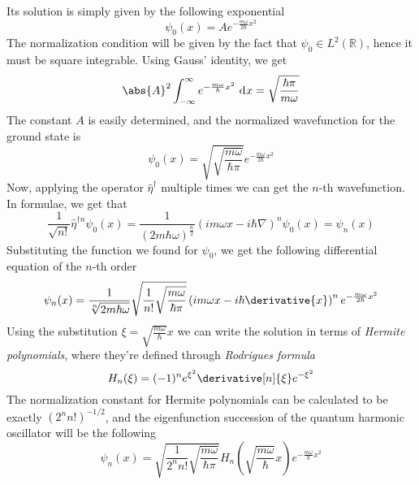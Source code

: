 \documentclass[a4paper, 11pt]{book}
\newcommand{\1}{\opr{\mathds{1}}}
\newcommand{\diff}[2][]{\ \mathrm{d}^{#1}#2}
\newcommand{\opr}[1]{\hat{#1}}
\newcommand{\adj}[2][]{#2^{\dagger#1}}
\theoremstyle{plain}
\begin{document}
	Its solution is simply given by the following exponential
	\begin{equation*}
		\psi_0(x)=Ae^{-\frac{m\omega}{2\hbar}x^2}
	\end{equation*}
	The normalization condition will be given by the fact that $\psi_0\in L^2(\mathbb{R})$, hence it must be square integrable. Using Gauss' identity, we get
	\begin{equation*}
		\abs{A}^2\int_{-\infty}^{\infty}e^{-\frac{m\omega}{\hbar}x^2}\diff{x}=\sqrt{\frac{\hbar\pi}{m\omega}}
	\end{equation*}
	The constant $A$ is easily determined, and the normalized wavefunction for the ground state is
	\begin{equation}
		\psi_0(x)=\sqrt{\sqrt{\frac{m\omega}{\hbar\pi}}}e^{-\frac{m\omega}{2\hbar}x^2}
		\label{eq:qhogsnorm}
	\end{equation}
	Now, applying the operator $\adj{\opr{\eta}}$ multiple times we can get the $n$-th wavefunction. In formulae, we get that
	\begin{equation*}
		\frac{1}{\sqrt{n!}}\adj[n]{\opr{\eta}}\psi_0(x)=\frac{1}{(2m\hbar\omega)^\frac{n}{2}}\left( im\omega x-i\hbar\nabla \right)^n\psi_0(x)=\psi_n(x)
	\end{equation*}
	Substituting the function we found for $\psi_0$, we get the following differential equation of the $n$-th order
	\begin{equation}
		\psi_n(x)=\frac{1}{\sqrt[n]{2m\hbar\omega}}\sqrt{\frac{1}{n!}\sqrt{\frac{m\omega}{\hbar\pi}}}\left( im\omega x-i\hbar\derivative{x} \right)^ne^{-\frac{m\omega}{2\hbar}x^2}
		\label{eq:nthqhoeigenfunc}
	\end{equation}
	Using the substitution $\xi=\sqrt{\frac{m\omega}{\hbar}}x$ we can write the solution in terms of \textit{Hermite polynomials}, where they're defined through \textit{Rodrigues formula}
	\begin{equation}
		H_n(\xi)=(-1)^ne^{\xi^2}\derivative[n]{\xi}e^{-\xi^2}
		\label{eq:rodrigueshermite}
	\end{equation}
	The normalization constant for Hermite polynomials can be calculated to be exactly $(2^nn!)^{-1/2}$, and the eigenfunction succession of the quantum harmonic oscillator will be the following
	\begin{equation}
		\psi_n(x)=\sqrt{\frac{1}{2^nn!}\sqrt{\frac{m\omega}{\hbar\pi}}}H_n\left( \sqrt{\frac{m\omega}{\hbar}}x \right)e^{-\frac{m\omega}{\hbar}x^2}
		\label{eq:psinqho}
	\end{equation}
\end{document}
